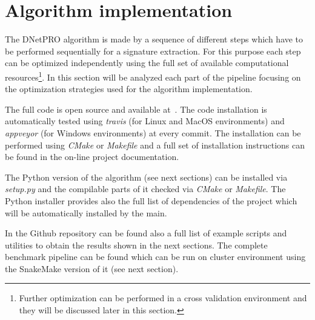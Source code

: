 \documentclass{standalone}
\begin{document}
\section[DNetPRO Implementation]{Algorithm implementation}\label{implementation}

The DNetPRO algorithm is made by a sequence of different steps which have to be performed sequentially for a signature extraction.
For this purpose each step can be optimized independently using the full set of available computational resources\footnote{
Further optimization can be performed in a cross validation environment and they will be discussed later in this section.
}.
In this section will be analyzed each part of the pipeline focusing on the optimization strategies used for the algorithm implementation.

The full code is open source and available at~\cite{DNetPRO}.
The code installation is automatically tested using \emph{travis} (for Linux and MacOS environments) and \emph{appveyor} (for Windows environments) at every commit.
The installation can be performed using \emph{CMake} or \emph{Makefile} and a full set of installation instructions can be found in the on-line project documentation.

The Python version of the algorithm (see next sections) can be installed via \emph{setup.py} and the compilable parts of it checked via \emph{CMake} or \emph{Makefile}.
The Python installer provides also the full list of dependencies of the project which will be automatically installed by the main.

In the Github repository can be found also a full list of example scripts and utilities to obtain the results shown in the next sections.
The complete benchmark pipeline can be found which can be run on cluster environment using the SnakeMake version of it (see next section).
\end{document}
